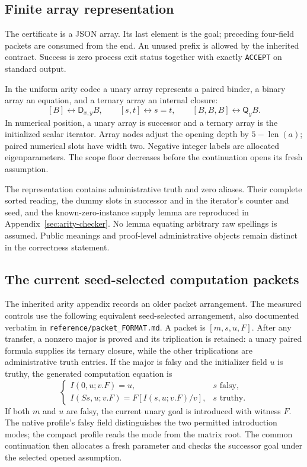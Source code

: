 \documentclass[11pt,letterpaper]{article}
\theoremstyle{definition}
\newcommand{\D}{\mathsf D}
\newcommand{\Q}{\mathsf Q}
\begin{document}
\subsection{Finite array representation}

The certificate is a JSON array. Its last element is the goal; preceding
four-field packets are consumed from the end. An unused prefix is allowed
by the inherited contract. Success is zero process exit status together
with exactly \texttt{ACCEPT} on standard output.

In the uniform arity codec a unary array represents a paired binder,
a binary array an equation, and a ternary array an internal closure:
\[
 [B]\leftrightarrow\D_{x,y}B,\qquad
 [s,t]\leftrightarrow s=t,\qquad
 [B,B,B]\leftrightarrow\Q_yB.
\]
In numerical position, a unary array is successor and a ternary array is
the initialized scalar iterator. Array nodes adjust the opening depth by
$5-\operatorname{len}(a)$; paired numerical slots have width two.
Negative integer labels are allocated eigenparameters. The scope floor
decreases before the continuation opens its fresh assumption.

The representation contains administrative truth and zero aliases.
Their complete sorted reading, the dummy slots in successor and in the
iterator's counter and seed, and the known-zero-instance supply lemma
are reproduced in Appendix~\ref{sec:arity-checker}. No lemma equating
arbitrary raw spellings is assumed. Public meanings and proof-level
administrative objects remain distinct in the correctness statement.

\subsection{The current seed-selected computation packets}

The inherited arity appendix records an older packet arrangement. The
measured controls use the following equivalent seed-selected arrangement,
also documented verbatim in \texttt{reference/packet\_FORMAT.md}. A packet
is $[m,s,u,F]$. After any transfer, a nonzero major is proved and its
triplication is retained: a unary paired formula supplies its ternary
closure, while the other triplications are administrative truth entries.
If the major is falsy and the initializer field $u$ is truthy, the generated
computation equation is
\[
 \begin{cases}
 I(0,u;v.F)=u,&s\text{ falsy},\\
 I(Ss,u;v.F)=F[I(s,u;v.F)/v],&s\text{ truthy}.
 \end{cases}
\]
If both $m$ and $u$ are falsy, the current unary goal is introduced with
witness $F$. The native profile's falsy field distinguishes the two
permitted introduction modes; the compact profile reads the mode from
the matrix root. The common continuation then allocates a fresh parameter
and checks the successor goal under the selected opened assumption.
\end{document}
